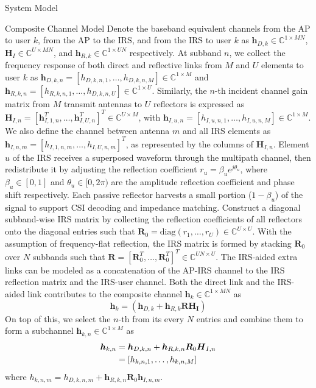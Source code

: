 \documentclass{IEEEtran}
\begin{document}
\begin{section} {System Model}
\begin{subsection}	{Composite Channel Model}
		Denote the baseband equivalent channels from the AP to user $k$, from the AP to the IRS, and from the IRS to user $k$ as $\boldsymbol{h}_{D,k} \in \mathbb{C}^{1 \times MN}$, $\boldsymbol{H}_I \in \mathbb{C}^{U \times MN}$, and $\boldsymbol{h}_{R,k} \in \mathbb{C}^{1 \times UN}$ respectively. At subband $n$, we collect the frequency response of both direct and reflective links from $M$ and $U$ elements to user $k$ as $\boldsymbol{h}_{D,k,n}=[h_{D,k,n,1},\dots,h_{D,k,n,M}] \in \mathbb{C}^{1 \times M}$ and $\boldsymbol{h}_{R,k,n}=[h_{R,k,n,1},\dots,h_{D,k,n,U}] \in \mathbb{C}^{1 \times U}$. Similarly, the $n$-th incident channel gain matrix from $M$ transmit antennas to $U$ reflectors is expressed as $\boldsymbol{H}_{I,n}=[\boldsymbol{h}_{I,1,n}^T,\dots,\boldsymbol{h}_{I,U,n}^T]^T \in \mathbb{C}^{U \times M}$, with $\boldsymbol{h}_{I,u,n}=[h_{I,u,n,1},\dots,h_{I,u,n,M}] \in \mathbb{C}^{1 \times M}$. We also define the channel between antenna $m$ and all IRS elements as $\boldsymbol{h}_{I,n,m}=[h_{I,1,n,m},\dots,h_{I,U,n,m}]^T$, as represented by the columns of $\boldsymbol{H}_{I,n}$. Element $u$ of the IRS receives a superposed waveform through the multipath channel, then redistribute it by adjusting the reflection coefficient $r_u = \beta_u e^{j \theta_u}$, where $\beta_u \in [0,1]$ and $\theta_u \in [0,2\pi)$ are the amplitude reflection coefficient and phase shift respectively. Each passive reflector harvests a small portion ($1 - \beta_u$) of the signal to support CSI decoding and impedance matching. Construct a diagonal subband-wise IRS matrix by collecting the reflection coefficients of all reflectors onto the diagonal entries such that $\boldsymbol{R}_0 = \text{diag}(r_1, \dots, r_U) \in \mathbb{C}^{U \times U}$. With the assumption of frequency-flat reflection, the IRS matrix is formed by stacking $\boldsymbol{R}_0$ over $N$ subbands such that $\boldsymbol{R} = [\boldsymbol{R}_0^T,\dots,\boldsymbol{R}_0^T]^T \in \mathbb{C}^{UN \times U}$. The IRS-aided extra links can be modeled as a concatenation of the AP-IRS channel to the IRS reflection matrix and the IRS-user channel. Both the direct link and the IRS-aided link contributes to the composite channel $\boldsymbol{h}_k \in \mathbb{C}^{1 \times MN}$ as
		\begin{equation}	\label{eq:h_k}
			\boldsymbol{h}_k = \left( \boldsymbol{h}_{D,k}+\boldsymbol{h}_{R,k} \boldsymbol{R} \boldsymbol{\boldsymbol{H}_I} \right)
		\end{equation}
		On top of this, we select the $n$-th from its every $N$ entries and combine them to form a subchannel $\boldsymbol{h}_{k,n} \in \mathbb{C}^{1 \times M}$ as
		\begin{equation}	\label{eq:h_{k,n}}
			\begin{split}
				\boldsymbol{h}_{k,n}
				&=\boldsymbol{h}_{D,k,n}+\boldsymbol{h}_{R,k,n}\boldsymbol{R}_0\boldsymbol{H}_{I,n}	\\
				&=[h_{k,n,1},\dots,h_{k,n,M}]
			\end{split}
		\end{equation}
		where $h_{k,n,m}=h_{D,k,n,m}+\boldsymbol{h}_{R,k,n}\boldsymbol{R}_0\boldsymbol{h}_{I,n,m}$.
	\end{subsection}


\end{section}
\end{document}
